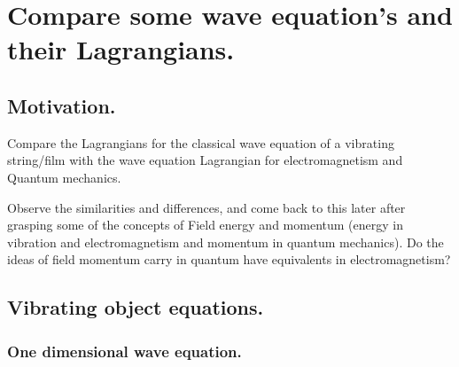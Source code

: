 
%
%


%

\chapter{Compare some wave equation's and their Lagrangians. }
\label{chap:waveLagrangian}
\date{ Dec 02, 2008.  $RCSfile: waveLagrangian.tex,v $ Last $Revision: 1.15 $ $Date: 2009/06/14 23:51:45 $ }

%



\section{Motivation. }

Compare the Lagrangians for the classical wave equation of a vibrating string/film with the wave equation Lagrangian for electromagnetism and Quantum mechanics.

Observe the similarities and differences, and come back to this later after grasping some of the concepts of Field energy and momentum (energy in vibration and electromagnetism and momentum in quantum mechanics).  Do the ideas of field momentum carry in quantum have equivalents in electromagnetism?

\section{Vibrating object equations. }

\subsection{One dimensional wave equation. }

